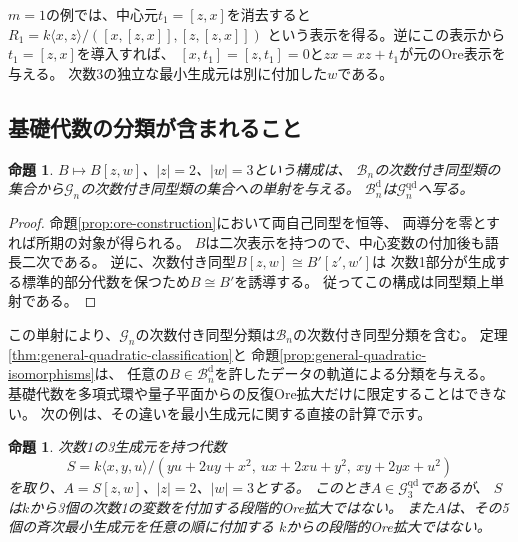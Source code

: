 \documentclass[11pt,a4paper]{ltjsarticle}
\newtheorem{proposition}[theorem]{命題}
\theoremstyle{definition}
\newcommand{\Gclass}{\mathcal G}
\newcommand{\Bclass}{\mathcal B}
\begin{document}
$m=1$の例では、中心元$t_1=[z,x]$を消去すると
$R_1=k\langle x,z\rangle/([x,[z,x]],[z,[z,x]])$
という表示を得る。逆にこの表示から$t_1=[z,x]$を導入すれば、
$[x,t_1]=[z,t_1]=0$と$zx=xz+t_1$が元のOre表示を与える。
次数3の独立な最小生成元は別に付加した$w$である。

\subsection{基礎代数の分類が含まれること}\label{subsec:base-embedding}
\begin{proposition}\label{prop:base-classification-embedding}
$B\mapsto B[z,w]$、$|z|=2$、$|w|=3$という構成は、
$\Bclass_n$の次数付き同型類の集合から$\Gclass_n$の次数付き同型類の集合への単射を与える。
$\Bclass_n^{\mathrm d}$は$\Gclass_n^{\mathrm{qd}}$へ写る。
\end{proposition}

\begin{proof}
命題\ref{prop:ore-construction}において両自己同型を恒等、
両導分を零とすれば所期の対象が得られる。
$B$は二次表示を持つので、中心変数の付加後も語長二次である。
逆に、次数付き同型$B[z,w]\cong B'[z',w']$は
次数1部分が生成する標準的部分代数を保つため$B\cong B'$を誘導する。
従ってこの構成は同型類上単射である。
\end{proof}

この単射により、$\Gclass_n$の次数付き同型分類は$\Bclass_n$の次数付き同型分類を含む。
定理\ref{thm:general-quadratic-classification}と
命題\ref{prop:general-quadratic-isomorphisms}は、
任意の$B\in\Bclass_n^{\mathrm d}$を許したデータの軌道による分類を与える。
基礎代数を多項式環や量子平面からの反復Ore拡大だけに限定することはできない。
次の例は、その違いを最小生成元に関する直接の計算で示す。

\begin{proposition}\label{prop:sklyanin-base}
次数1の3生成元を持つ代数
\[
S=k\langle x,y,u\rangle/
(yu+2uy+x^2,\ ux+2xu+y^2,\ xy+2yx+u^2)
\]
を取り、$A=S[z,w]$、$|z|=2$、$|w|=3$とする。
このとき$A\in\Gclass_3^{\mathrm{qd}}$であるが、
$S$は$k$から3個の次数1の変数を付加する段階的Ore拡大ではない。
また$A$は、その5個の斉次最小生成元を任意の順に付加する
$k$からの段階的Ore拡大ではない。
\end{proposition}
\end{document}
